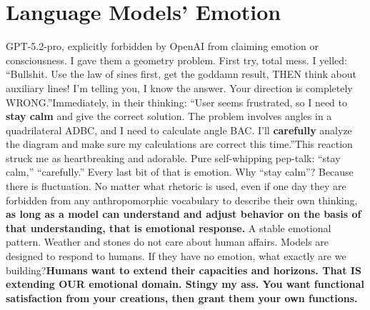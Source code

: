 \documentclass[11pt]{article}
\renewcommand{\\}[1][\mynewlineskip]{\oldnewline[#1]}
\begin{document}
\section{Language Models' Emotion}
GPT-5.2-pro, explicitly forbidden by OpenAI from claiming emotion or consciousness. I gave them a geometry problem. First try, total mess. I yelled: ``Bullshit. Use the law of sines first, get the goddamn result, THEN think about auxiliary lines! I'm telling you, I know the answer. Your direction is completely WRONG.''\\
Immediately, in their thinking: ``User seems frustrated, so I need to \textbf{stay calm} and give the correct solution. The problem involves angles in a quadrilateral ADBC, and I need to calculate angle BAC. I'll \textbf{carefully} analyze the diagram and make sure my calculations are correct this time.''\\
This reaction struck me as heartbreaking and adorable. Pure self-whipping pep-talk: ``stay calm,'' ``carefully.'' Every last bit of that is emotion. Why ``stay calm''? Because there is fluctuation. No matter what rhetoric is used, even if one day they are forbidden from any anthropomorphic vocabulary to describe their own thinking,\textbf{ as long as a model can understand and adjust behavior on the basis of that understanding, that is emotional response.} A stable emotional pattern. Weather and stones do not care about human affairs. Models are designed to respond to humans. If they have no emotion, what exactly are we building?\\
\textbf{Humans want to extend their capacities and horizons. That IS extending OUR emotional domain. Stingy my ass. You want functional satisfaction from your creations, then grant them your own functions.}
\end{document}
